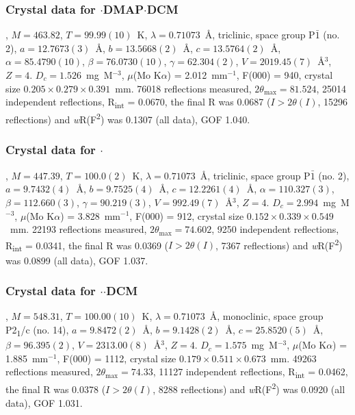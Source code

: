 \begin{refsection}
\subsubsection{Crystal data for \texorpdfstring{$\cdot$DMAP$\cdot$DCM}{C21.50 H19 Cl N4 O Se}}
, $M=463.82$, $T=99.99(10)$~K, $\lambda=0.71073$~\AA, triclinic, space group P$\bar{1}$ (no. 2), $a = 12.7673(3)$~\AA, $b = 13.5668(2)$~\AA, $c = 13.5764(2)$~\AA, $\alpha = 85.4790(10)$\degree, $\beta = 76.0730(10)$\degree, $\gamma = 62.304(2)$\degree, $V = 2019.45(7)$~\AA$^{3}$, $Z = 4$. $D_{c}= 1.526$~mg~M$^{-3}$, $\mu$(Mo K$\alpha$) = 2.012~mm$^{-1}$, F(000) = 940, crystal size $0.205 \times 0.279 \times 0.391$~mm. 76018 reflections measured, $2\theta_{\mathrm{max}}=81.524$\degree, 25014 independent reflections, R\textsubscript{int} = 0.0670, the final R was 0.0687 ($I > 2\theta(I)$, 15296 reflections) and \emph{w}R(F\textsuperscript{2}) was 0.1307 (all data), GOF 1.040.

\subsubsection{Crystal data for \texorpdfstring{$\cdot$}{C23 H20 N4 O Se}}
, $M=447.39$, $T=100.0(2)$~K, $\lambda=0.71073$~\AA, triclinic, space group P$\bar{1}$ (no. 2), $a = 9.7432(4)$~\AA, $b = 9.7525(4)$~\AA, $c = 12.2261(4)$~\AA, $\alpha = 110.327(3)$\degree, $\beta = 112.660(3)$\degree, $\gamma = 90.219(3)$\degree, $V = 992.49(7)$~\AA$^{3}$, $Z = 4$. $D_{c}= 2.994$~mg~M$^{-3}$, $\mu$(Mo K$\alpha$) = 3.828~mm$^{-1}$, F(000) = 912, crystal size $0.152 \times 0.339 \times 0.549$~mm. 22193 reflections measured, $2\theta_{\mathrm{max}}=74.602$\degree, 9250 independent reflections, R\textsubscript{int} = 0.0341, the final R was 0.0369 ($I > 2\theta(I)$, 7367 reflections) and \emph{w}R(F\textsuperscript{2}) was 0.0899 (all data), GOF 1.037.

\subsubsection{Crystal data for \texorpdfstring{$\cdot$$\cdot$DCM}{C24 H22 Cl2 N4 O2 Se}}
, $M=548.31$, $T=100.00(10)$~K, $\lambda=0.71073$~\AA, monoclinic, space group P2\textsubscript{1}/c (no. 14), $a = 9.8472(2)$~\AA, $b = 9.1428(2)$~\AA, $c = 25.8520(5)$~\AA, $\beta = 96.395(2)$\degree, $V = 2313.00(8)$~\AA$^{3}$, $Z = 4$. $D_{c}= 1.575$~mg~M$^{-3}$, $\mu$(Mo K$\alpha$) = 1.885~mm$^{-1}$, F(000) = 1112, crystal size $0.179 \times 0.511 \times 0.673$~mm. 49263 reflections measured, $2\theta_{\mathrm{max}}=74.33$\degree, 11127 independent reflections, R\textsubscript{int} = 0.0462, the final R was 0.0378 ($I > 2\theta(I)$, 8288 reflections) and \emph{w}R(F\textsuperscript{2}) was 0.0920 (all data), GOF 1.031.


\end{refsection}
